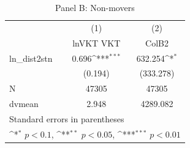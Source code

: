 \begin{table}[htbp]\centering
\def\sym#1{\ifmmode^{#1}\else\(^{#1}\)\fi}
\caption{Panel B: Non-movers}
\begin{tabular}{l*{2}{c}}
\hline\hline
            &\multicolumn{1}{c}{(1)}&\multicolumn{1}{c}{(2)}\\
            &\multicolumn{1}{c}{lnVKT VKT}&\multicolumn{1}{c}{ColB2}\\
\hline
ln\_dist2stn &       0.696\sym{***}&     632.254\sym{*}  \\
            &     (0.194)         &   (333.278)         \\
\hline
N           &       47305         &       47305         \\
dvmean      &       2.948         &    4289.082         \\
\hline\hline
\multicolumn{3}{l}{\footnotesize Standard errors in parentheses}\\
\multicolumn{3}{l}{\footnotesize \sym{*} \(p<0.1\), \sym{**} \(p<0.05\), \sym{***} \(p<0.01\)}\\
\end{tabular}
\end{table}
